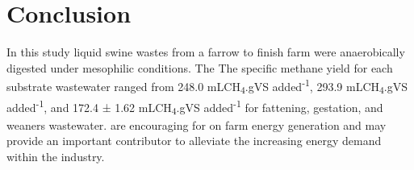 \section{Conclusion}
In this study liquid swine wastes from a farrow to finish farm were anaerobically digested under mesophilic conditions. The The specific methane yield for each substrate wastewater ranged from 248.0 mLCH\textsubscript{4}.gVS added\textsuperscript{-1}, 293.9 mLCH\textsubscript{4}.gVS added\textsuperscript{-1}, and 172.4 ± 1.62 mLCH\textsubscript{4}.gVS added\textsuperscript{-1} for fattening, gestation, and weaners wastewater. are encouraging for on farm energy generation and may provide an important contributor to alleviate the increasing energy demand within the industry.